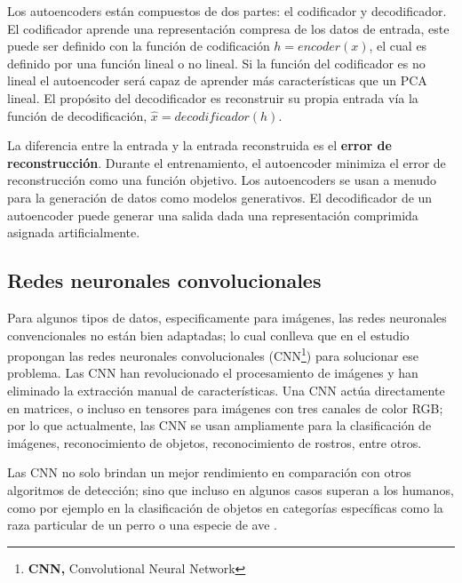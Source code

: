 Los autoencoders est\'{a}n compuestos de dos partes: el codificador y decodificador. El codificador aprende una representaci\'{o}n compresa de los datos de entrada, este puede ser definido con la funci\'{o}n de codificaci\'{o}n $h=encoder(x)$, el cual es definido por una funci\'{o}n lineal o no lineal. Si la funci\'{o}n del codificador es no lineal el autoencoder ser\'{a} capaz de aprender m\'{a}s caracter\'{i}sticas que un PCA lineal. El prop\'{o}sito del decodificador es reconstruir su propia entrada v\'{i}a la funci\'{o}n de decodificaci\'{o}n, $\hat{x} = decodificador(h)$.

\vspace{5mm} %

La diferencia entre la entrada y la entrada reconstruida es el \textbf{error de reconstrucción}. Durante el entrenamiento, el autoencoder minimiza el error de reconstrucción como una función objetivo. Los autoencoders se usan a menudo para la generación de datos como modelos generativos. El decodificador de un autoencoder puede generar una salida dada una representación comprimida asignada artificialmente.

\subsection{Redes neuronales convolucionales}

Para algunos tipos de datos, especificamente para im\'{a}genes, las redes neuronales convencionales no est\'{a}n bien adaptadas; lo cual conlleva que en el estudio  propongan las redes neuronales convolucionales (CNN\footnote{\textbf{CNN,} Convolutional Neural Network}) para solucionar ese problema. Las CNN han revolucionado el procesamiento de im\'{a}genes y han eliminado la extracci\'{o}n manual de caracter\'{i}sticas. Una CNN act\'{u}a directamente en matrices, o incluso en tensores para im\'{a}genes con tres canales de color RGB; por lo que actualmente, las CNN se usan ampliamente para la clasificaci\'{o}n de im\'{a}genes, reconocimiento de objetos, reconocimiento de rostros, entre otros.

\vspace{5mm} %

Las CNN no solo brindan un mejor rendimiento en comparaci\'{o}n con otros algoritmos de detecci\'{o}n; sino que incluso en algunos casos superan a los humanos, como por ejemplo en la clasificaci\'{o}n de objetos en categor\'{i}as espec\'{i}ficas como la raza particular de un perro o una especie de ave \cite{Reference49}.

